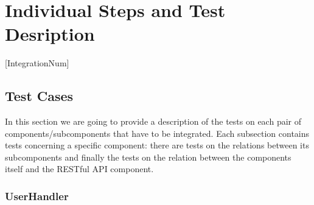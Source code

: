 \pagebreak
\section{Individual Steps and Test Desription}

[IntegrationNum]

\newcommand{\Test}[4]{
	\stepcounter{TestNum}
	\begin{center}
		\begin{tabular}{|l p{9 cm}|}
			\hline
			\textbf{Test Case Identifier} & I\arabic{IntegrationNum}T\arabic{TestNum}\\
			\textbf{Test Items} & #1\\
			\textbf{Input Specification} & #2\\
			\textbf{Output Specification} & #3\\
			\textbf{Environmental Needs} & #4\\
			\hline
		\end{tabular}
	\end{center}
}

\newcommand{\Procedure}[2]{
	\stepcounter{ProcNum}
	\begin{center}
		\begin{tabular}{|l p{10 cm}|}
			\hline
			\textbf{Test Procedure Identifier} & TP\arabic{ProcNum}\\
			\hline
			\textbf{Purpose} & #1\\
			\hline
			\textbf{Procedure Steps} & #2\\
			\hline
		\end{tabular}
	\end{center}
}

\subsection{Test Cases}

In this section we are going to provide a description of the tests on each pair of components/subcomponents that have to be integrated. 
Each subsection contains tests concerning a specific component: there are tests on the relations between its subcomponents and finally the tests on the relation between the components itself and the RESTful API component.


\subsubsection{UserHandler}

